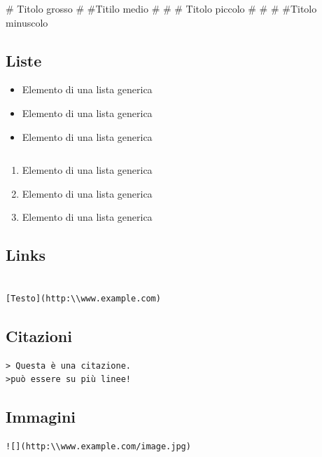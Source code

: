 \documentclass[12pt,a4paper]{article}
\begin{document}
\# {\Large Titolo grosso}
\newline
\# \#{\normalsize Titilo medio}
\newline
\# \# \# {\small Titolo piccolo}
\newline
\# \# \# \#{\tiny Titolo minuscolo}

\subsection{Liste}
\renewcommand{\labelitemi}{$\ast$}
\begin{itemize}
	\item Elemento di una lista generica
	\item Elemento di una lista generica
	\item Elemento di una lista generica
\end{itemize}
\begin{verbatim}

\end{verbatim}
\begin{enumerate}
	\item Elemento di una lista generica
	\item Elemento di una lista generica
	\item Elemento di una lista generica
\end{enumerate}

\subsection{Links}

\begin{verbatim}

[Testo](http:\\www.example.com)

\end{verbatim}

\subsection{Citazioni}

\begin{verbatim}
> Questa è una citazione.
>può essere su più linee!
\end{verbatim}

\subsection{Immagini}
\begin{verbatim}
![](http:\\www.example.com/image.jpg)
\end{verbatim}
\end{document}
